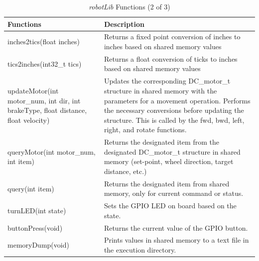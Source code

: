 \documentclass[12pt,oneside,final]{siuethesis}
\theoremstyle{definition}
\begin{document}
\begin{table}[htbp!]
	\centering
	\begin{tabular}{|p{6cm} | p{9cm}|}
		\hline
		Functions & Description \\ \hline
		inches2tics(float inches) & Returns a fixed point conversion of inches to inches based on shared memory values \\ \hline
		tics2inches(int32\_t tics) & Returns a float conversion of ticks to inches based on shared memory values \\ \hline 
		updateMotor(int motor\_num, int dir, int brakeType, float distance, float velocity) & Updates the corresponding DC\_motor\_t structure in shared memory with the parameters for a movement operation. Performs the necessary conversions before updating the structure. This is called by the fwd, bwd, left, right, and rotate functions. \\ \hline
		queryMotor(int motor\_num, int item) & Returns the designated item from the designated DC\_motor\_t structure in shared memory (set-point, wheel direction, target distance, etc.) \\ \hline
		query(int item) & Returns the designated item from shared memory, only for current command or status. \\ \hline
		turnLED(int state) & Sets the GPIO LED on board based on the state. \\ \hline
		buttonPress(void)  & Returns the current value of the GPIO button. \\ \hline
		memoryDump(void) & Prints values in shared memory to a text file in the execution directory. \\ \hline
		
		\end{tabular}
		 \caption{\emph{robotLib} Functions (2 of 3)}
 	\label{Tab:robotLibFun2}
\end{table}
				
\end{document}

